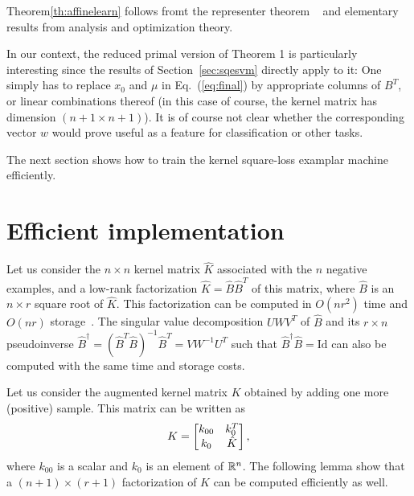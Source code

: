 \documentclass[12pt,letterpaper]{article}
\begin{document}
Theorem\ref{th:affinelearn} follows fromt the representer theorem
~\cite{SHS01,Wahba90} and elementary results from analysis and
optimization theory.
 
In our context, the reduced primal version of Theorem 1 is
particularly interesting since the results of Section~\ref{sec:sqesvm}
directly apply to it: One simply has to replace $x_0$ and $\mu$ in
Eq.~(\ref{eq:final}) by appropriate columns of $B^T$, or linear
combinations thereof (in this case of course, the kernel matrix has
dimension $(n+1\times n+1)$). It is of course not clear whether the
corresponding vector $w$ would prove useful as a feature for
classification or other tasks.
 
The next section shows how to train the kernel square-loss examplar
machine efficiently.
 
 
 
\section{Efficient implementation}
Let us consider the $n\times n$ kernel matrix $\hat{K}$ associated with
the $n$ negative examples, and a low-rank factorization $\hat{K}=\hat{B}\hat{B}^T$
of
this matrix, where $\hat{B}$ is an
$n\times r$ square root of $\hat{K}$. This factorization can be computed in $O(nr^2)$ time
and $O(nr)$ storage~\cite{BaJo05,FiSc01}. The singular value
decomposition $UWV^T$ of $\hat{B}$ and its $r\times n$ pseudoinverse
$\hat{B}^\dagger=(\hat{B}^T\hat{B})^{-1}\hat{B}^T=VW^{-1}U^T$ such that $\hat{B}^\dagger
\hat{B}=\text{Id}$ can also be computed with the same time and storage
costs.
 
Let us consider the augmented
kernel matrix $K$ obtained by adding one more (positive) sample. This matrix
can be written as
\begin{equation}
K=\left[\begin{matrix}k_{00} & k_0^T\\k_0& \hat{K}\end{matrix}\right],
\end{equation}
where $k_{00}$ is a scalar and $k_0$ is an element of $\mathbb{R}^n$.
The following
lemma show that a $(n+1)\times (r+1)$ factorization of $K$ can
be computed efficiently as well.
 
\end{document}
